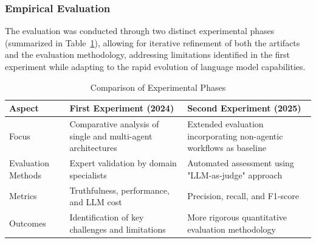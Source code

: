         \subsubsection{Empirical Evaluation}
        
        The evaluation was conducted through two distinct experimental phases (summarized in Table~\ref{tab:experiments}), allowing for iterative refinement of both the artifacts and the evaluation methodology, addressing limitations identified in the first experiment while adapting to the rapid evolution of language model capabilities.
        
        \begin{table}[h]
        \centering
        \caption{Comparison of Experimental Phases}
        \begin{tabular}{|p{}|p{}|p{}|}
        \hline
        \textbf{Aspect} & \textbf{First Experiment (2024)} & \textbf{Second Experiment (2025)} \\
        \hline
        Focus & Comparative analysis of single and multi-agent architectures & Extended evaluation incorporating non-agentic workflows as baseline \\
        \hline
        Evaluation Methods & Expert validation by domain specialists & Automated assessment using "LLM-as-judge" approach \\
        \hline
        Metrics & Truthfulness, performance, and LLM cost & Precision, recall, and F1-score \\
        \hline
        Outcomes & Identification of key challenges and limitations & More rigorous quantitative evaluation methodology \\
        \hline
        \end{tabular}
        \label{tab:experiments}
        \end{table}
        
    
    
        
